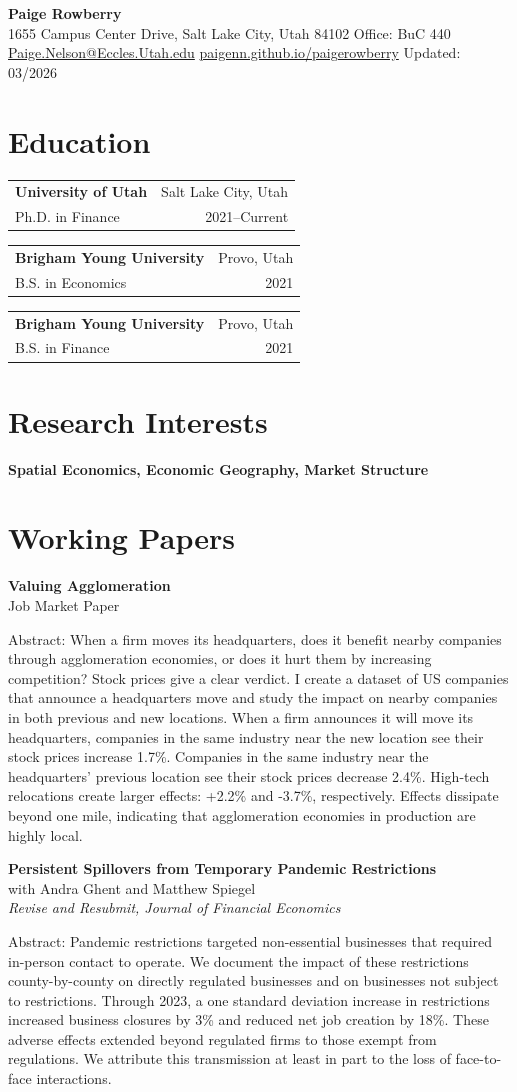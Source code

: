 \documentclass[11pt]{article}
\makeatletter
\newcommand{\eduentry}[4]{%
\begin{tabular*}{\textwidth}{@{}l@{\extracolsep{\fill}}r@{}}
\textbf{#1} & #2 \\
#3 & #4 \\
\end{tabular*}\vspace{0.6em}
}
\newcommand{\cvsection}[2][12]{%
\Needspace{#1\baselineskip}%
\section*{#2}%
}
\newenvironment{paperentry}{%
\samepage
}{%
\vspace{0.6em}%
\par
}
\makeatother
\begin{document}
\pagestyle{plain}

\begin{center}
{\LARGE \textbf{Paige Rowberry}}\\[0.3em]
1655 Campus Center Drive, Salt Lake City, Utah 84102 \textbar{} Office: BuC 440\\
\href{mailto:Paige.Nelson@Eccles.Utah.edu}{Paige.Nelson@Eccles.Utah.edu} \textbar{}
\href{https://paigenn.github.io/paigerowberry/}{paigenn.github.io/paigerowberry} \textbar{} Updated: 03/2026
\end{center}

\cvsection{Education}
\eduentry{University of Utah}{Salt Lake City, Utah}{Ph.D. in Finance}{2021--Current}
\eduentry{Brigham Young University}{Provo, Utah}{B.S. in Economics}{2021}
\eduentry{Brigham Young University}{Provo, Utah}{B.S. in Finance}{2021}

\cvsection{Research Interests}
\textbf{Spatial Economics, Economic Geography, Market Structure}

\cvsection{Working Papers}
\begin{paperentry}
\textbf{Valuing Agglomeration}\\
Job Market Paper

Abstract: When a firm moves its headquarters, does it benefit nearby companies through agglomeration economies, or does it hurt them by increasing competition? Stock prices give a clear verdict. I create a dataset of US companies that announce a headquarters move and study the impact on nearby companies in both previous and new locations. When a firm announces it will move its headquarters, companies in the same industry near the new location see their stock prices increase 1.7\%. Companies in the same industry near the headquarters' previous location see their stock prices decrease 2.4\%. High-tech relocations create larger effects: +2.2\% and -3.7\%, respectively. Effects dissipate beyond one mile, indicating that agglomeration economies in production are highly local.
\end{paperentry}

\begin{paperentry}
\textbf{Persistent Spillovers from Temporary Pandemic Restrictions}\\
with Andra Ghent and Matthew Spiegel\\
\emph{Revise and Resubmit, Journal of Financial Economics}

Abstract: Pandemic restrictions targeted non-essential businesses that required in-person contact to operate. We document the impact of these restrictions county-by-county on directly regulated businesses and on businesses not subject to restrictions. Through 2023, a one standard deviation increase in restrictions increased business closures by 3\% and reduced net job creation by 18\%. These adverse effects extended beyond regulated firms to those exempt from regulations. We attribute this transmission at least in part to the loss of face-to-face interactions.
\end{paperentry}
\end{document}
